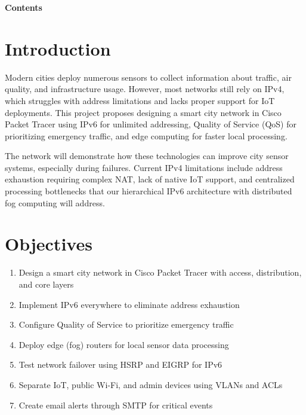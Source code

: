 \documentclass[12pt,a4paper]{article}
\begin{document}
\newpage
\begin{center}
    {\Huge \textbf{Contents}}
\end{center}
\vspace{1.5em}

\tableofcontents
\newpage



\section*{Introduction}
{}
Modern cities deploy numerous sensors to collect information about traffic, air quality, and infrastructure usage. However, most networks still rely on IPv4, which struggles with address limitations and lacks proper support for IoT deployments. This project proposes designing a smart city network in Cisco Packet Tracer using IPv6 for unlimited addressing, Quality of Service (QoS) for prioritizing emergency traffic, and edge computing for faster local processing. 

The network will demonstrate how these technologies can improve city sensor systems, especially during failures. Current IPv4 limitations include address exhaustion requiring complex NAT, lack of native IoT support, and centralized processing bottlenecks that our hierarchical IPv6 architecture with distributed fog computing will address.

\section*{Objectives}
{}
\begin{enumerate}[label=2.\arabic*, nosep]
    \item Design a smart city network in Cisco Packet Tracer with access, distribution, and core layers
    \item Implement IPv6 everywhere to eliminate address exhaustion
    \item Configure Quality of Service to prioritize emergency traffic
    \item Deploy edge (fog) routers for local sensor data processing
    \item Test network failover using HSRP and EIGRP for IPv6
    \item Separate IoT, public Wi-Fi, and admin devices using VLANs and ACLs
    \item Create email alerts through SMTP for critical events
\end{enumerate}
\end{document}

